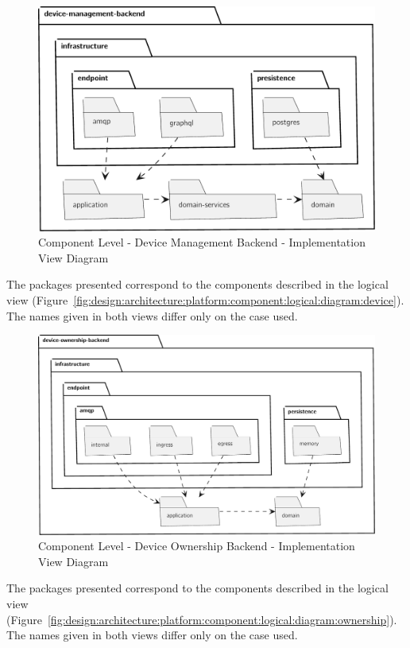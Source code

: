 \begin{figure}[H]
   \centering
   \includegraphics[page=1,width=0.8\columnwidth]{assets/diagrams/design/architectural/level3/development/device-management-backend.pdf}
   \caption[Component Level - Device Management Backend - Implementation View Diagram]{Component Level - Device Management Backend - Implementation View Diagram}
   \label{fig:design:architecture:platform:component:development:diagram:device}
\end{figure}

The packages presented correspond to the components described in the logical view (Figure~\ref{fig:design:architecture:platform:component:logical:diagram:device}). The names given in both views differ only on the case used.

\begin{figure}[H]
   \centering
   \includegraphics[page=1,width=0.8\columnwidth]{assets/diagrams/design/architectural/level3/development/device-ownership-backend.pdf}
   \caption[Component Level - Device Ownership Backend - Implementation View Diagram]{Component Level - Device Ownership Backend - Implementation View Diagram}
   \label{fig:design:architecture:platform:component:development:diagram:ownership}
\end{figure}

The packages presented correspond to the components described in the logical view (Figure~\ref{fig:design:architecture:platform:component:logical:diagram:ownership}). The names given in both views differ only on the case used.
